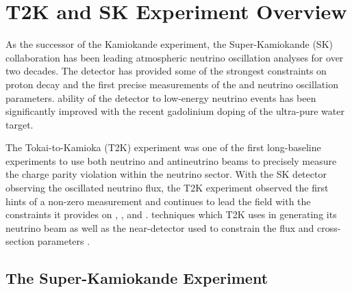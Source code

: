 \chapter{T2K and SK Experiment Overview}
\label{chap:T2KSKExp}

As the successor of the Kamiokande experiment, the Super-Kamiokande (SK) collaboration has been leading atmospheric neutrino oscillation analyses for over two decades. The detector has provided some of the strongest constraints on proton decay  and  the first precise measurements of the \delmsqatm and \sinsqatm neutrino oscillation parameters.   ability of the detector to low-energy neutrino events has been significantly improved with the recent gadolinium doping of the ultra-pure water target.  

The Tokai-to-Kamioka (T2K) experiment was one of the first long-baseline experiments to use both neutrino and antineutrino beams to precisely measure the charge parity violation within the neutrino sector. With the SK detector observing the oscillated neutrino flux, the T2K experiment observed the first hints of a non-zero \sinsqreac measurement and continues to lead the field with the constraints it provides on \sinsqreac, \sinsqatm, \delmsqatm and \dcp.   techniques which T2K uses in generating its neutrino beam as well as the near-detector used to constrain the flux and cross-section parameters  .

\section{The Super-Kamiokande Experiment}
\label{sec:T2KSKExp_SK}

